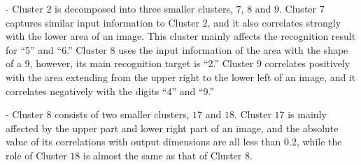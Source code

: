 \documentclass{article}
\begin{document}
- Cluster $2$ is decomposed into three smaller clusters, $7$, $8$ and $9$. Cluster $7$ captures similar input information to Cluster $2$, and it also correlates strongly with the lower area of an image. This cluster mainly affects the recognition result for ``5'' and ``6.'' Cluster $8$ uses the input information of the area with the shape of a $9$, however, its main recognition target is ``2.'' Cluster $9$ correlates positively with the area extending from the upper right to the lower left of an image, and it correlates negatively with the digits ``4'' and ``9.'' 

- Cluster $8$ consists of two smaller clusters, $17$ and $18$. Cluster $17$ is mainly affected by the upper part and lower right part of an image, and the absolute value of its correlations with output dimensions are all less than $0.2$, while the role of Cluster $18$ is almost the same as that of Cluster $8$. 
\end{document}
